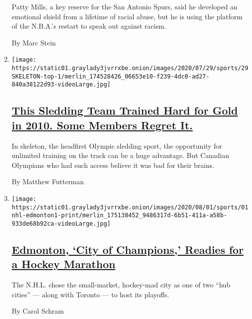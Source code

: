 \begin{enumerate}
  Patty Mills, a key reserve for the San Antonio Spurs, said he
  developed an emotional shield from a lifetime of racial abuse, but he
  is using the platform of the N.B.A.'s restart to speak out against
  racism.

  By Marc Stein
\item
  \texttt{[image: https://static01.graylady3jvrrxbe.onion/images/2020/07/29/sports/29SKELETON-top-1/merlin\_174528426\_06653e10-f239-4dc0-ad27-840a38122d93-videoLarge.jpg]}

  \hypertarget{this-sledding-team-trained-hard-for-gold-in-2010-some-members-regret-it}{%
  \subsection{\texorpdfstring{\href{/2020/08/01/sports/olympics/concussion-skeleton-sledding-brain-damage.html}{This
  Sledding Team Trained Hard for Gold in 2010. Some Members Regret
  It.}}{This Sledding Team Trained Hard for Gold in 2010. Some Members Regret It.}}\label{this-sledding-team-trained-hard-for-gold-in-2010-some-members-regret-it}}

  In skeleton, the headfirst Olympic sledding sport, the opportunity for
  unlimited training on the track can be a huge advantage. But Canadian
  Olympians who had such access believe it was bad for their brains.

  By Matthew Futterman
\item
  \texttt{[image: https://static01.graylady3jvrrxbe.onion/images/2020/08/01/sports/01nhl-edmonton1-print/merlin\_175138452\_9486317d-6b51-411a-a58b-933de68b92ca-videoLarge.jpg]}

  \hypertarget{edmonton-city-of-champions-readies-for-a-hockey-marathon}{%
  \subsection{\texorpdfstring{\href{/2020/08/01/sports/hockey/edmonton-nhl-playoffs.html}{Edmonton,
  `City of Champions,' Readies for a Hockey
  Marathon}}{Edmonton, `City of Champions,' Readies for a Hockey Marathon}}\label{edmonton-city-of-champions-readies-for-a-hockey-marathon}}

  The N.H.L. chose the small-market, hockey-mad city as one of two ``hub
  cities'' --- along with Toronto --- to host its playoffs.

  By Carol Schram
\end{enumerate}

